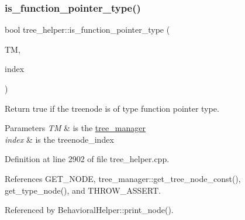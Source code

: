 \subsubsection{\texorpdfstring{is\+\_\+function\+\_\+pointer\+\_\+type()}{is\_function\_pointer\_type()}}
{\footnotesize\ttfamily bool tree\+\_\+helper\+::is\+\_\+function\+\_\+pointer\+\_\+type (\begin{DoxyParamCaption}\item[{const \hyperlink{tree__manager_8hpp_a792e3f1f892d7d997a8d8a4a12e39346}{tree\+\_\+manager\+Const\+Ref} \&}]{TM,  }\item[{const unsigned int}]{index }\end{DoxyParamCaption})\hspace{0.3cm}{\ttfamily [static]}}



Return true if the treenode is of type function pointer type. 


\begin{DoxyParams}{Parameters}
{\em TM} & is the \hyperlink{classtree__manager}{tree\+\_\+manager} \\
\hline
{\em index} & is the treenode\+\_\+index \\
\hline
\end{DoxyParams}


Definition at line 2902 of file tree\+\_\+helper.\+cpp.



References G\+E\+T\+\_\+\+N\+O\+DE, tree\+\_\+manager\+::get\+\_\+tree\+\_\+node\+\_\+const(), get\+\_\+type\+\_\+node(), and T\+H\+R\+O\+W\+\_\+\+A\+S\+S\+E\+RT.



Referenced by Behavioral\+Helper\+::print\+\_\+node().

